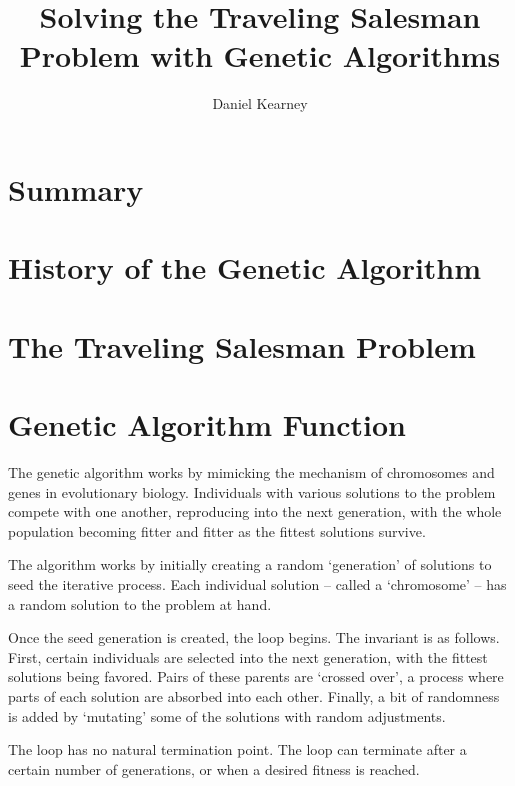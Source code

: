 \documentclass[UTF8]{report}
\begin{document}
\title{%
  Solving the Traveling Salesman Problem with Genetic Algorithms 
}

\author{Daniel Kearney}

\maketitle

\tableofcontents
\pagebreak

\section{Summary}

\section{History of the Genetic Algorithm}

\section{The Traveling Salesman Problem}

\section{Genetic Algorithm Function}

The genetic algorithm works by mimicking the mechanism of chromosomes and genes in evolutionary biology. Individuals with various solutions to the problem compete with one another, reproducing into the next generation, with the whole population becoming fitter and fitter as the fittest solutions survive.

The algorithm works by initially creating a random `generation' of solutions to seed the iterative process. Each individual solution -- called a `chromosome' -- has a random solution to the problem at hand.  

Once the seed generation is created, the loop begins. The invariant is as follows. First, certain individuals are selected into the next generation, with the fittest solutions being favored. Pairs of these parents are `crossed over', a process where parts of each solution are absorbed into each other. Finally, a bit of randomness is added by `mutating' some of the solutions with random adjustments. 

The loop has no natural termination point. The loop can terminate after a certain number of generations, or when a desired fitness is reached. 
\end{document}
